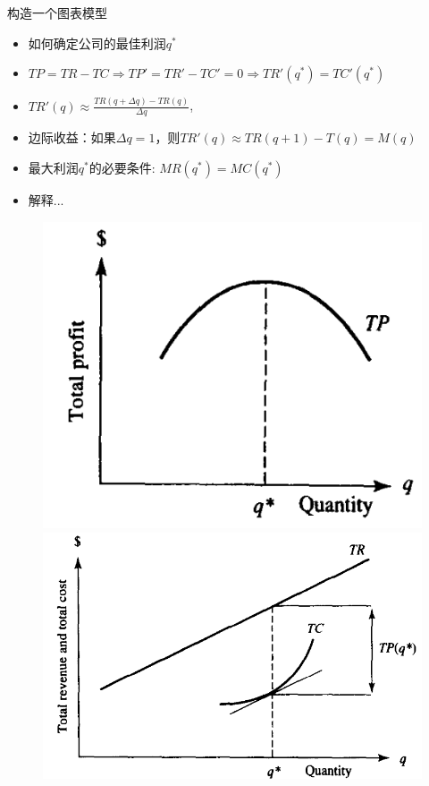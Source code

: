 \documentclass[UTF8]{ctexbeamer}
\begin{document}
\begin{frame}{构造一个图表模型}
  \begin{itemize}
  \item 如何确定公司的最佳利润$q^*$
  \item $TP = TR - TC \Rightarrow TP' = TR' - TC' = 0 \Rightarrow TR'(q^*) = TC'(q^*)$
  \item $TR'(q) \approx \frac{TR(q+\Delta q)-TR(q)}{\Delta q}$,
  \item 边际收益：如果$\Delta q = 1$，则$TR'(q) \approx TR(q+1)-T(q)=M(q)$
  \item 最大利润$q^*$的必要条件: $MR(q^*) = MC(q^*)$
  \item 解释...
  \end{itemize}
  
  \begin{figure}
    \includegraphics[height=.35\textheight]{profit.png}
    \includegraphics[height=.35\textheight]{totalcr.png}

\end{figure}
\end{frame}
\end{document}
